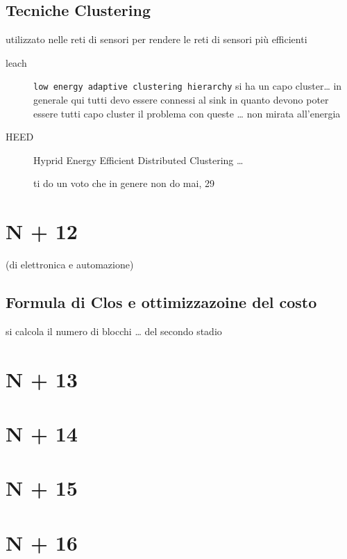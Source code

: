 \documentclass[11pt]{article}
\begin{document}
\subsection{Tecniche Clustering}
\label{sec:orga89de51}
utilizzato nelle reti di sensori per rendere le reti di sensori più efficienti
\begin{description}
\item[{leach}] \texttt{low energy adaptive clustering hierarchy}
si ha un capo cluster\ldots{}
in generale qui tutti devo essere connessi al sink in quanto devono poter essere tutti capo cluster
il problema con queste \ldots{}
non mirata all'energia
\item[{HEED}] Hyprid Energy Efficient Distributed Clustering
\ldots{}

ti do un voto che in genere non do mai, 29
\end{description}

\section{N + 12}
\label{sec:org0490377}
(di elettronica e automazione)
\subsection{Formula di Clos e ottimizzazoine del costo}
\label{sec:orgb07d826}
si calcola il numero di blocchi \ldots{} del secondo stadio

\section{N + 13}
\label{sec:orgb2e5eb0}
\section{N + 14}
\label{sec:orgefbb3ee}
\section{N + 15}
\label{sec:orgb59038f}
\section{N + 16}
\label{sec:org2d695a6}
\end{document}

